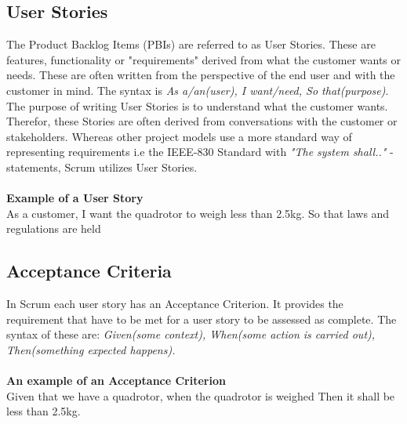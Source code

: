 

\subsection{User Stories}
The Product Backlog Items (PBIs) are referred to as User Stories. These are features, functionality or "requirements" derived from what the customer wants or needs. These are often written from the perspective of the end user and with the customer in mind. The syntax is \textit{As a/an(user), I want/need, So that(purpose)}. The purpose of writing User Stories is to understand what the customer wants. Therefor, these Stories are often derived from conversations with the customer or stakeholders. Whereas other project models use a more standard way of representing requirements i.e the IEEE-830 Standard with \textit{"The system shall.."} - statements, Scrum utilizes User Stories. 
\\ \\
\textbf{Example of a User Story} \\
As a customer, I want the quadrotor to weigh less than 2.5kg. So that laws and regulations are held 

\subsection{Acceptance Criteria}
In Scrum each user story has an Acceptance Criterion. It provides the requirement that have to be met for a user story to be assessed as complete.  
The syntax of these are: \textit{Given(some context), When(some action is carried out), Then(something expected happens).} \\
\\ 
\textbf{An example of an Acceptance Criterion} \\
Given that we have a quadrotor, when the quadrotor is weighed Then it shall be less than 2.5kg.

